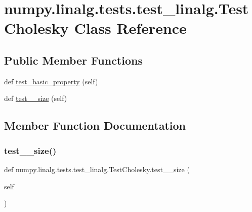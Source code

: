 \hypertarget{classnumpy_1_1linalg_1_1tests_1_1test__linalg_1_1TestCholesky}{}\section{numpy.\+linalg.\+tests.\+test\+\_\+linalg.\+Test\+Cholesky Class Reference}
\label{classnumpy_1_1linalg_1_1tests_1_1test__linalg_1_1TestCholesky}
\subsection*{Public Member Functions}
\begin{DoxyCompactItemize}
\item 
def \hyperlink{classnumpy_1_1linalg_1_1tests_1_1test__linalg_1_1TestCholesky_a61bc32613e3bb58f0dc6d80d85782fb2}{test\+\_\+basic\+\_\+property} (self)
\item 
def \hyperlink{classnumpy_1_1linalg_1_1tests_1_1test__linalg_1_1TestCholesky_acc4e76eac22022cf370b78ababaf0ba1}{test\+\_\+\_\+size} (self)
\end{DoxyCompactItemize}


\subsection{Member Function Documentation}
\mbox{\label{classnumpy_1_1linalg_1_1tests_1_1test__linalg_1_1TestCholesky_acc4e76eac22022cf370b78ababaf0ba1}} 
\subsubsection{\texorpdfstring{test\+\_\+\_\+size()}{test\_0\_size()}}
{\footnotesize\ttfamily def numpy.\+linalg.\+tests.\+test\+\_\+linalg.\+Test\+Cholesky.\+test\+\_\+\_\+size (\begin{DoxyParamCaption}\item[{}]{self }\end{DoxyParamCaption})}

